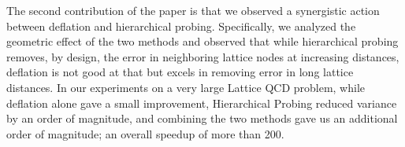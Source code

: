 \documentclass{report}
\begin{document}
The second contribution of the paper is that we observed a synergistic action
between deflation and hierarchical probing.
Specifically, we analyzed the geometric effect of the two methods and observed that
while hierarchical probing removes, by design, the error in neighboring lattice nodes
at increasing distances, deflation is not good at that but excels in removing error
in long lattice distances.
In our experiments on a very large Lattice QCD problem,
while deflation alone gave a small improvement, Hierarchical Probing
reduced variance by an order of magnitude, and
combining the two methods gave us an additional order of magnitude;
an overall speedup of more than 200.
\end{document}
